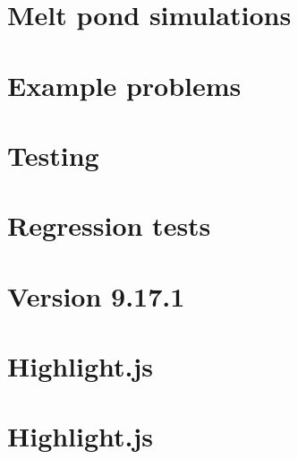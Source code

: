\chapter{Melt pond simulations}
\label{md__home_parkinsonjl_mushy-layer_examples_meltponds_readme}

\chapter{Example problems}
\label{md__home_parkinsonjl_mushy-layer_examples_readme}

\chapter{Testing}
\label{md__home_parkinsonjl_mushy-layer_test__r_e_a_d_m_e}

\chapter{Regression tests}
\label{md__home_parkinsonjl_mushy-layer_test_regression_readme}

\chapter{Version 9.17.1}
\label{md__home_parkinsonjl_mushy-layer_web_highlight__c_h_a_n_g_e_s}

\chapter{Highlight.\+js}
\label{md__home_parkinsonjl_mushy-layer_web_highlight__r_e_a_d_m_e}

\chapter{Highlight.\+js}
\label{md__home_parkinsonjl_mushy-layer_web_highlight__r_e_a_d_m_e_8ru}

